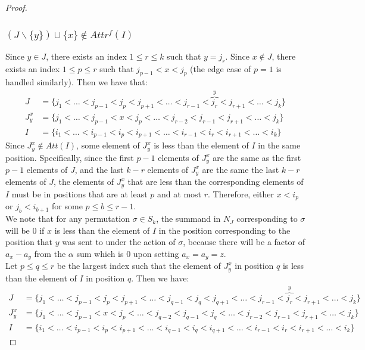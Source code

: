 \documentclass[10pt,a4paper]{amsart}
\begin{document}
\begin{proof}
\subsubsection{$(J\backslash\{y\})\cup\{x\}\notin Attr^{f}(I)$}
Since $y \in J$, there exists an index $1 \leq r \leq k$ such that $y = j_r$. Since $x \not\in J$, there exists an index $1 \leq p \leq r$ such that $j_{p-1} < x < j_p$ (the edge case of $p = 1$ is handled similarly). Then we have that:
\begin{align*}
J &= \{j_1 < \ldots < j_{p-1} < j_p < j_{p+1} < \ldots < j_{r-1} < \overbrace{j_r}^{y} < j_{r+1} < \ldots < j_k\}\\
J_y^x &= \{j_1 < \ldots < j_{p-1} < x< j_p < \ldots < j_{r-2} < j_{r-1} < j_{r+1} < \ldots < j_k\}\\
I &= \{i_1 < \ldots < i_{p-1} < i_p < i_{p+1} < \ldots < i_{r-1} < i_r < i_{r+1} < \ldots < i_k\}
\end{align*}
Since $J_y^x \not\in Att(I)$, some element of $J_{y}^{x}$ is less than the element of $I$ in the same position. Specifically, since the first $p-1$ elements of $J_{y}^{x}$ are the same as the first $p-1$ elements of $J$, and the last $k-r$ elements of $J_{y}^{x}$ are the same the last $k-r$ elements of $J$, the elements of $J_{y}^{x}$ that are less than the corresponding elements of $I$ must be in positions that are at least $p$ and  at most $r$. Therefore, either $x < i_p$ or $j_{b} < i_{b+1}$ for some $p \leq b \leq r-1$.\\ We note that for any permutation $\sigma \in S_k$, the summand in $N_J$ corresponding to $\sigma$ will be 0 if $x$ is less than the element of $I$ in the position corresponding to the position that $y$ was sent to under the action of $\sigma$, because there will be a factor of $a_x - a_y$ from the $\alpha$ sum which is 0 upon setting $a_x = a_y = z$.\\
Let $p \leq q \leq r$ be the largest index such that the element of $J_y^x$ in position $q$ is less than the element of $I$ in position $q$. Then we have:
\begin{align*}
J &= \{j_1 < \ldots < j_{p-1} < j_p < j_{p+1} < \ldots < j_{q-1} < j_q < j_{q+1} < \ldots < j_{r-1} < \overbrace{j_r}^{y} < j_{r+1} < \ldots < j_k\}\\
J_y^x &= \{j_1 < \ldots < j_{p-1} < x< j_p < \ldots < j_{q-2} < j_{q-1} < j_{q} < \ldots < j_{r-2} < j_{r-1} < j_{r+1} < \ldots < j_k\}\\
I &= \{i_1 < \ldots < i_{p-1} < i_p < i_{p+1} < \ldots < i_{q-1} < i_q < i_{q+1} < \ldots < i_{r-1} < i_r < i_{r+1} < \ldots < i_k\}

\end{align*}
\end{proof}
\end{document}
